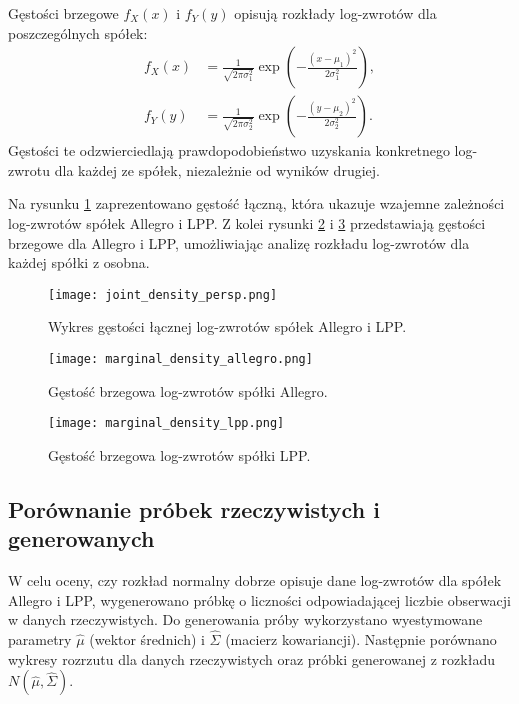 \documentclass[12pt]{article}
\begin{document}
\noindent Gęstości brzegowe \( f_X(x) \) i \( f_Y(y) \) opisują rozkłady log-zwrotów dla poszczególnych spółek:
\begin{align*}
f_X(x) &= \frac{1}{\sqrt{2 \pi \sigma_1^2}} \exp\left(-\frac{(x-\mu_1)^2}{2\sigma_1^2}\right), \\
f_Y(y) &= \frac{1}{\sqrt{2 \pi \sigma_2^2}} \exp\left(-\frac{(y-\mu_2)^2}{2\sigma_2^2}\right).
\end{align*}
Gęstości te odzwierciedlają prawdopodobieństwo uzyskania konkretnego log-zwrotu dla każdej ze spółek, niezależnie od wyników drugiej.

\noindent Na rysunku \ref{fig:joint_density} zaprezentowano gęstość łączną, która ukazuje wzajemne zależności log-zwrotów spółek Allegro i LPP. Z kolei rysunki \ref{fig:marginal_density_allegro} i \ref{fig:marginal_density_lpp} przedstawiają gęstości brzegowe dla Allegro i LPP, umożliwiając analizę rozkładu log-zwrotów dla każdej spółki z osobna.

\begin{figure}[H]
    \centering
    \texttt{[image: joint\_density\_persp.png]}
    \caption{Wykres gęstości łącznej log-zwrotów spółek Allegro i LPP.}
    \label{fig:joint_density}
\end{figure}

\begin{figure}[H]
    \centering
    \texttt{[image: marginal\_density\_allegro.png]}
    \caption{Gęstość brzegowa log-zwrotów spółki Allegro.}
    \label{fig:marginal_density_allegro}
\end{figure}

\begin{figure}[H]
    \centering
    \texttt{[image: marginal\_density\_lpp.png]}
    \caption{Gęstość brzegowa log-zwrotów spółki LPP.}
    \label{fig:marginal_density_lpp}
\end{figure}


\subsection{Porównanie próbek rzeczywistych i generowanych}

W celu oceny, czy rozkład normalny dobrze opisuje dane log-zwrotów dla spółek Allegro i LPP, wygenerowano próbkę o liczności odpowiadającej liczbie obserwacji w danych rzeczywistych. Do generowania próby wykorzystano wyestymowane parametry \( \hat{\mu} \) (wektor średnich) i \( \hat{\Sigma} \) (macierz kowariancji). Następnie porównano wykresy rozrzutu dla danych rzeczywistych oraz próbki generowanej z rozkładu \( N(\hat{\mu}, \hat{\Sigma}) \).
\end{document}

